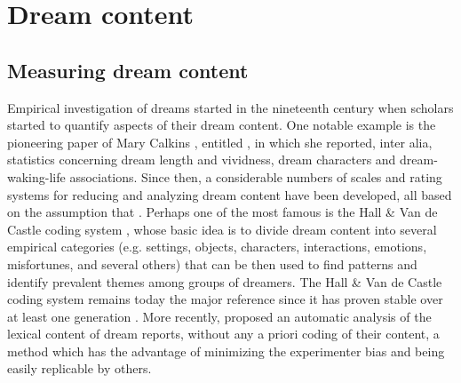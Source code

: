 \cleardoublepage

\chapter{Dream content}
\label{sec:dream-content}


\section{Measuring dream content}
\label{sec:dream-content:method}

Empirical investigation of dreams started in the nineteenth century when scholars started to quantify aspects of their dream content. One notable example is the pioneering paper of Mary Calkins \citeyearpar{calkins_statistics_1893}, entitled , in which she reported, inter alia, statistics concerning dream length and vividness, dream characters and dream-waking-life associations. Since then, a considerable numbers of scales and rating systems for reducing and analyzing dream content have been developed, all based on the assumption that  \citep{schredl_dream_2010}. Perhaps one of the most famous is the Hall \& Van de Castle coding system \citep{hall_content_1966}, whose basic idea is to divide dream content into several empirical categories (e.g. settings, objects, characters, interactions, emotions, misfortunes, and several others) that can be then used to find patterns and identify prevalent themes among groups of dreamers. The Hall \& Van de Castle coding system remains today the major reference since it has proven stable over at least one generation \citep{hall_dreams_1982}. More recently, \citet{schwartz_exploration_1999} proposed an automatic analysis of the lexical content of dream reports, without any a priori coding of their content, a method which has the advantage of minimizing the experimenter bias and being easily replicable by others.

